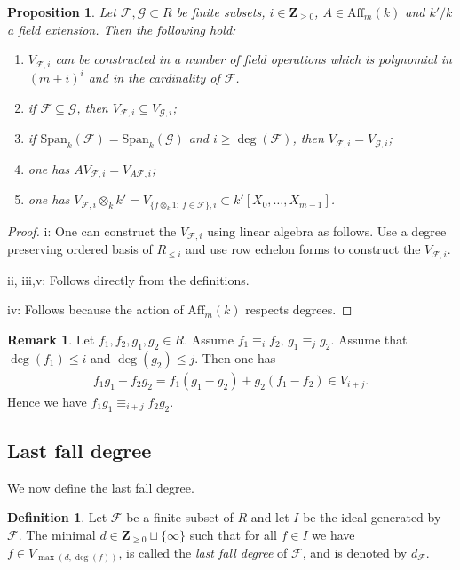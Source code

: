 \documentclass{amsart}
\theoremstyle{plain}
\newtheorem{proposition}[theorem]{Proposition}
\theoremstyle{definition}
\newtheorem{definition}[theorem]{Definition}
\newtheorem{remark}[theorem]{Remark}
\begin{document}
\begin{proposition} \label{4213}
Let $\mathcal{F}, \mathcal{G} \subset R$ be finite subsets, $i \in {\mathbf{Z}}_{\geq 0}$, $A \in \mathrm{Aff}_m(k)$ and $k'/k$ a field extension. Then the following hold:
\begin{enumerate}
\item $V_{\mathcal{F},i}$ can be constructed in a number of field operations which is polynomial in $(m+i)^i$ and in the cardinality of $\mathcal{F}$.
\item if $\mathcal{F} \subseteq \mathcal{G}$, then $V_{\mathcal{F},i} \subseteq V_{\mathcal{G},i}$;
\item if $\mathrm{Span}_k(\mathcal{F}) = \mathrm{Span}_k(\mathcal{G})$ and $i \geq \deg(\mathcal{F})$, then $V_{\mathcal{F},i}=V_{\mathcal{G},i}$;
\item one has $A V_{\mathcal{F},i}= V_{A \mathcal{F},i}$;
\item one has $V_{\mathcal{F},i} \otimes_k k' = V_{\{f \otimes_k 1:\ f \in \mathcal{F} \},i} \subset k'[X_0,\ldots,X_{m-1}]$.
\end{enumerate}
\end{proposition}
\begin{proof}
i: One can construct the $V_{\mathcal{F},i}$ using linear algebra as follows. Use a degree preserving ordered basis of $R_{\leq i}$ and use row echelon forms to construct the $V_{\mathcal{F},i}$.

ii, iii,v: Follows directly from the definitions.
 
iv: Follows because the action of $\mathrm{Aff}_m(k)$ respects degrees.
\end{proof}

\begin{remark} \label{yy}
Let $f_1, f_2, g_1, g_2 \in R$. Assume $f_1 \equiv_i f_2$, $g_1 \equiv_j g_2$. Assume that $\deg(f_1) \leq i$ and $\deg(g_2) \leq j$. Then one has
\begin{eqnarray*}
f_1g_1-f_2g_2 = f_1(g_1-g_2)+g_2(f_1-f_2) \in V_{i+j}.
\end{eqnarray*}
Hence we have $f_1 g_1 \equiv_{i+j} f_2 g_2$.
\end{remark}

\subsection{Last fall degree}

We now define the last fall degree.

\begin{definition}
Let $\mathcal{F}$ be a finite subset of $R$ and let $I$ be the ideal generated by $\mathcal{F}$.
The minimal $d \in {\mathbf{Z}}_{\geq 0} \sqcup \{\infty\}$ such that for all $f \in I$ we have $f \in V_{\max(d, \deg(f))}$, is called the \emph{last fall degree} of $\mathcal{F}$, and is denoted by $d_{\mathcal{F}}$.
\end{definition}
\end{document}
